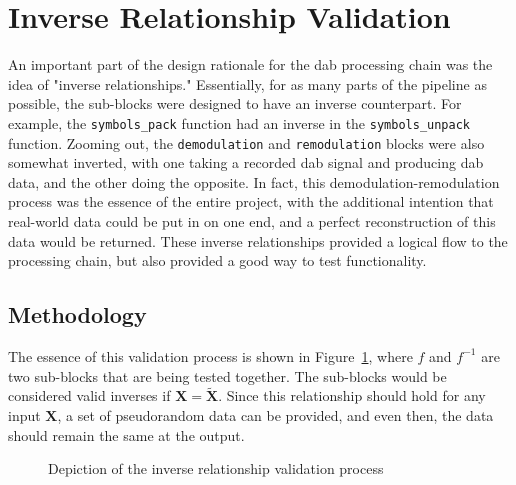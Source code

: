 \documentclass[class=report,11pt,crop=false]{standalone}
\begin{document}

\section{Inverse Relationship Validation}
An important part of the design rationale for the \gls{dab} processing chain was the idea of "inverse relationships." Essentially, for as many parts of the pipeline as possible, the sub-blocks were designed to have an inverse counterpart. For example, the \texttt{symbols\_pack} function had an inverse in the \texttt{symbols\_unpack} function. Zooming out, the \texttt{demodulation} and \texttt{remodulation} blocks were also somewhat inverted, with one taking a recorded \gls{dab} signal and producing \gls{dab} data, and the other doing the opposite. In fact, this demodulation-remodulation process was the essence of the entire project, with the additional intention that real-world data could be put in on one end, and a perfect reconstruction of this data would be returned. These inverse relationships provided a logical flow to the processing chain, but also provided a good way to test functionality.

\subsection{Methodology}
The essence of this validation process is shown in Figure~\ref{fig:inverse-overview}, where \(f\) and \(f^{-1}\) are two sub-blocks that are being tested together. The sub-blocks would be considered valid inverses if \(\mathbf{X} = \mathbf{\tilde{X}}\). Since this relationship should hold for any input \(\mathbf{X}\), a set of pseudorandom data can be provided, and even then, the data should remain the same at the output.

\begin{figure}[htbp]
  \centering
  \captionsetup{type=figure}
  \def\svgwidth{0.8\linewidth}
  { %
      }
  \caption{Depiction of the inverse relationship validation process}
  \label{fig:inverse-overview}
\end{figure}
\end{document}
